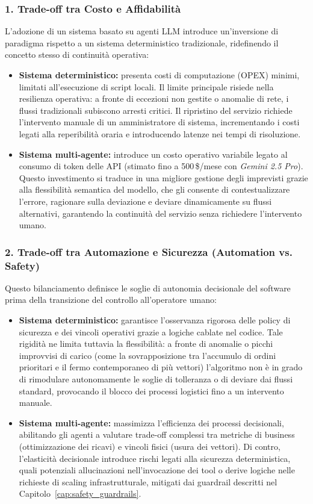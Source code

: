 \subsubsection*{1. Trade-off tra Costo e Affidabilità}
L'adozione di un sistema basato su agenti LLM introduce un'inversione di paradigma rispetto a un sistema deterministico tradizionale, ridefinendo il concetto stesso di continuità operativa:

\begin{itemize}
    \item \textbf{Sistema deterministico:} presenta costi di computazione (OPEX) minimi, limitati all'esecuzione di script locali. Il limite principale risiede nella resilienza operativa: a fronte di eccezioni non gestite o anomalie di rete, i flussi tradizionali subiscono arresti critici. Il ripristino del servizio richiede l'intervento manuale di un amministratore di sistema, incrementando i costi legati alla reperibilità oraria e introducendo latenze nei tempi di risoluzione.
    \item \textbf{Sistema multi-agente:} introduce un costo operativo variabile legato al consumo di token delle API (stimato fino a 500\,\$/mese con \textit{Gemini 2.5 Pro}). Questo investimento si traduce in una migliore gestione degli imprevisti grazie alla flessibilità semantica del modello, che gli consente di contestualizzare l'errore, ragionare sulla deviazione e deviare dinamicamente su flussi alternativi, garantendo la continuità del servizio senza richiedere l'intervento umano.
\end{itemize}

\subsubsection*{2. Trade-off tra Automazione e Sicurezza (Automation vs. Safety)}
Questo bilanciamento definisce le soglie di autonomia decisionale del software prima della transizione del controllo all'operatore umano:

\begin{itemize}
    \item \textbf{Sistema deterministico:} garantisce l'osservanza rigorosa delle policy di sicurezza e dei vincoli operativi grazie a logiche cablate nel codice. Tale rigidità ne limita tuttavia la flessibilità: a fronte di anomalie o picchi improvvisi di carico (come la sovrapposizione tra l'accumulo di ordini prioritari e il fermo contemporaneo di più vettori) l'algoritmo non è in grado di rimodulare autonomamente le soglie di tolleranza o di deviare dai flussi standard, provocando il blocco dei processi logistici fino a un intervento manuale.
    \item \textbf{Sistema multi-agente:} massimizza l'efficienza dei processi decisionali, abilitando gli agenti a valutare trade-off complessi tra metriche di business (ottimizzazione dei ricavi) e vincoli fisici (usura dei vettori). Di contro, l'elasticità decisionale introduce rischi legati alla sicurezza deterministica, quali potenziali allucinazioni nell'invocazione dei tool o derive logiche nelle richieste di scaling infrastrutturale, mitigati dai guardrail descritti nel Capitolo~\ref{cap:safety_guardrails}.
\end{itemize}
